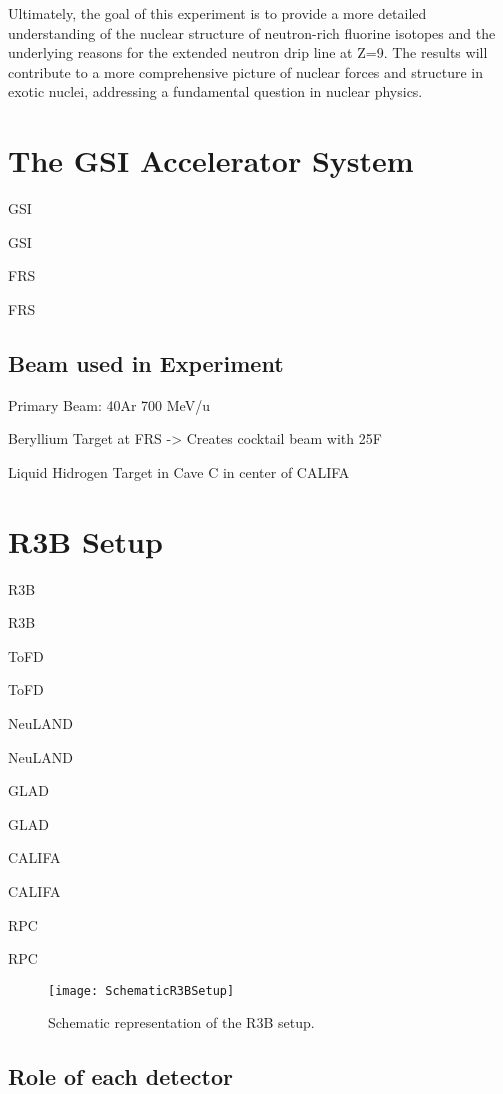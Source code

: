 Ultimately, the goal of this experiment is to provide a more detailed understanding of the nuclear structure of neutron-rich fluorine isotopes and the underlying reasons for the extended neutron drip line at Z=9. The results will contribute to a more comprehensive picture of nuclear forces and structure in exotic nuclei, addressing a fundamental question in nuclear physics.


\section{The GSI Accelerator System}

\gls{GSI}

\gls{GSI}

\gls{FRS}

\gls{FRS}

\subsection{Beam used in Experiment}

Primary Beam: 40Ar 700 MeV/u

Beryllium Target at FRS -> Creates cocktail beam with 25F

Liquid Hidrogen Target in Cave C in center of CALIFA

\section{R3B Setup}

\gls{R3B}

\gls{R3B}

\gls{ToFD}

\gls{ToFD}

\gls{NeuLAND}

\gls{NeuLAND}

\gls{GLAD}

\gls{GLAD}

\gls{CALIFA}

\gls{CALIFA}

\gls{RPC}

\gls{RPC}
\begin{figure}
	\texttt{[image: SchematicR3BSetup]}
	\caption{Schematic representation of the R3B setup.}
	\label{fig:R3BSetup}
\end{figure}



\subsection{Role of each detector}

